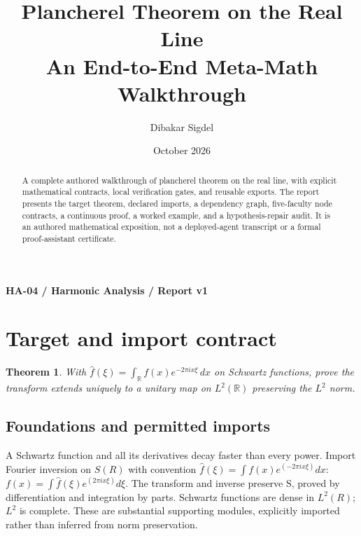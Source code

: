 \documentclass[preprint,12pt,aps,pra,showkeys,amsmath,amssymb,superscriptaddress,floatfix]{revtex4-2}
\newtheorem{theorem}{Theorem}[section]
\theoremstyle{definition}
\theoremstyle{remark}
\begin{document}
\title{Plancherel Theorem on the Real Line\\[4pt]\large An End-to-End Meta-Math Walkthrough}

\author{Dibakar Sigdel}


\date{October 2026}

\begin{abstract}

A complete authored walkthrough of plancherel theorem on the real line,
with explicit mathematical contracts, local verification gates, and
reusable exports. The report presents the target theorem, declared
imports, a dependency graph, five-faculty node contracts, a continuous
proof, a worked example, and a hypothesis-repair audit. It is an
authored mathematical exposition, not a deployed-agent transcript or a
formal proof-assistant certificate.

\end{abstract}\maketitle\linespread{1.12}\selectfont

\noindent\textbf{HA-04 / Harmonic Analysis / Report v1}

\section{Target and import contract}

\begin{theorem}

With \(\widehat f(\xi)=\int_{\mathbb R}f(x)e^{-2\pi ix\xi}\,dx\) on
Schwartz functions, prove the transform extends uniquely to a unitary
map on \(L^2(\mathbb R)\) preserving the \(L^{2}\) norm.

\end{theorem}

\subsection{Foundations and permitted imports}

A Schwartz function and all its derivatives decay faster than every
power. Import Fourier inversion on \(S(R)\) with convention
\(\widehat f(\xi )=\int f(x)e^{(-2\pi ix\xi )}dx\):
\(f(x)=\int \widehat f(\xi )e^{(2\pi ix\xi )}d\xi\). The transform and
inverse preserve S, proved by differentiation and integration by parts.
Schwartz functions are dense in \(L^{2}(R)\); \(L^{2}\) is complete.
These are substantial supporting modules, explicitly imported rather
than inferred from norm preservation.
\end{document}
